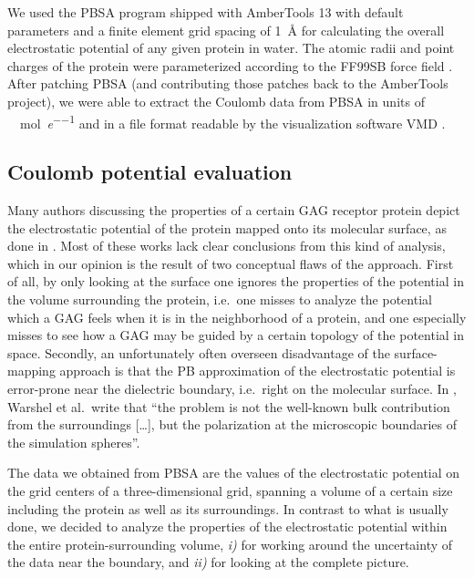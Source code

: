 We used the PBSA program shipped with AmberTools 13 \cite{case_amber_12} with
default parameters and a finite element grid spacing of \SI{1}{\angstrom} for
calculating the overall electrostatic potential of any given protein in water.
The atomic radii and point charges of the protein were parameterized according
to the FF99SB force field \cite{case_amber_12}. After patching PBSA (and
contributing those patches back to the AmberTools project), we were able to
extract the Coulomb data from PBSA in units of
\si{\kilo\calory\per\mole\per\elementarycharge} and in a file format readable by
the visualization software VMD \cite{vmd_1996}.

\subsection{Coulomb potential evaluation}

Many authors discussing the properties of a certain GAG receptor protein depict
the electrostatic potential of the protein mapped onto its molecular surface, as
done in \cite{rogers_gag_prot_prot_2011,%
Gandhi01102009,sapay_hs_growthfactors_2011,%
gandhi_bmp_heparin_binding_sites_2012,sost_heparin_2009,%
catK_cs4_crystal_structure_2008,hydrolase_gags_2011,gandhi_structure_2008,%
imberty_gag_prot_carbres_2007,gags_as_polyelectrolytes_2010}. Most of these
works lack clear conclusions from this kind of analysis, which in our opinion is
the result of two conceptual flaws of the approach. First of all, by only
looking at the surface one ignores the properties of the potential in the volume
surrounding the protein, i.e.\ one misses to analyze the potential which a GAG
feels when it is in the neighborhood of a protein, and one especially misses to
see how a GAG may be guided by a certain topology of the potential in space.
Secondly, an unfortunately often overseen disadvantage of the surface-mapping
approach is that the PB approximation of the electrostatic potential is
 error-prone near the dielectric boundary, i.e.\ right on the
molecular surface. In \cite{estatic_proteins_warshel_2006}, Warshel et al.\
write that \enquote{the problem is not the well-known bulk contribution from the
surroundings [\dots], but the polarization at the microscopic boundaries of the
simulation spheres}.

The data we obtained from PBSA are the values of the electrostatic potential on
the grid centers of a three-dimensional grid, spanning a volume of a certain
size including the protein as well as its surroundings. In contrast to what is
usually done, we decided to analyze the properties of the electrostatic
potential within the entire protein-surrounding volume, \textit{i)} for working
around the uncertainty of the data near the boundary, and \textit{ii)} for
looking at the complete picture.

